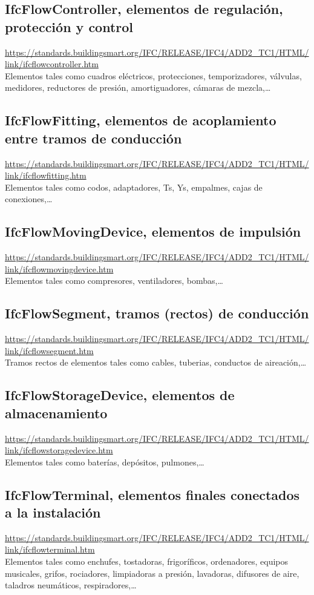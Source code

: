 \documentclass[spanish,12pt,a4paper,final,oneside]{book}
\begin{document}
\subsection{IfcFlowController, elementos de regulación, protección y control}
\url{https://standards.buildingsmart.org/IFC/RELEASE/IFC4/ADD2_TC1/HTML/link/ifcflowcontroller.htm}
\\Elementos tales como cuadros eléctricos, protecciones, temporizadores, válvulas, medidores, reductores de presión, amortiguadores, cámaras de mezcla,\ldots

\subsection{IfcFlowFitting, elementos de acoplamiento entre tramos de conducción}
\url{https://standards.buildingsmart.org/IFC/RELEASE/IFC4/ADD2_TC1/HTML/link/ifcflowfitting.htm}
\\Elementos tales como codos, adaptadores, Ts, Ys, empalmes, cajas de conexiones,\ldots

\subsection{IfcFlowMovingDevice, elementos de impulsión}
\url{https://standards.buildingsmart.org/IFC/RELEASE/IFC4/ADD2_TC1/HTML/link/ifcflowmovingdevice.htm}
\\Elementos tales como compresores, ventiladores, bombas,\ldots

\subsection{IfcFlowSegment, tramos (rectos) de conducción}
\url{https://standards.buildingsmart.org/IFC/RELEASE/IFC4/ADD2_TC1/HTML/link/ifcflowsegment.htm}
\\Tramos rectos de elementos tales como cables, tuberias, conductos de aireación,\ldots

\subsection{IfcFlowStorageDevice, elementos de almacenamiento}
\url{https://standards.buildingsmart.org/IFC/RELEASE/IFC4/ADD2_TC1/HTML/link/ifcflowstoragedevice.htm}
\\Elementos tales como baterías, depósitos, pulmones,\ldots

\subsection{IfcFlowTerminal, elementos finales conectados a la instalación}
\url{https://standards.buildingsmart.org/IFC/RELEASE/IFC4/ADD2_TC1/HTML/link/ifcflowterminal.htm}
\\Elementos tales como enchufes, tostadoras, frigoríficos, ordenadores, equipos musicales, grifos, rociadores, limpiadoras a presión, lavadoras, difusores de aire, taladros neumáticos, respiradores,\ldots
\end{document}
